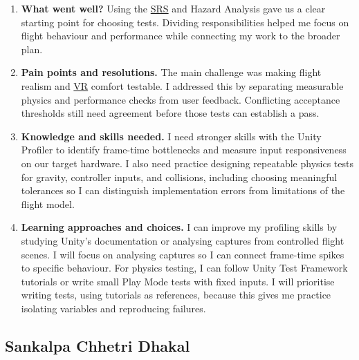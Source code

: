 \documentclass[12pt, titlepage]{article}
\begin{document}
\begin{enumerate}
  \item \textbf{What went well?}
  Using the \hyperlink{abbr:SRS}{SRS} and Hazard Analysis gave us a clear starting point for choosing
  tests. Dividing responsibilities helped me focus on flight behaviour and
  performance while connecting my work to the broader plan.

  \item \textbf{Pain points and resolutions.}
  The main challenge was making flight realism and \hyperlink{abbr:VR}{VR} comfort testable. I
  addressed this by separating measurable physics and performance checks from
  user feedback. Conflicting acceptance thresholds still need agreement before
  those tests can establish a pass.

  \item \textbf{Knowledge and skills needed.}
  I need stronger skills with the Unity Profiler to identify frame-time
  bottlenecks and measure input responsiveness on our target hardware. I also
  need practice designing repeatable physics tests for gravity, controller
  inputs, and collisions, including choosing meaningful tolerances so I can
  distinguish implementation errors from limitations of the flight model.

  \item \textbf{Learning approaches and choices.}
  I can improve my profiling skills by studying Unity's documentation or
  analysing captures from controlled flight scenes. I will focus on analysing
  captures so I can connect frame-time spikes to specific behaviour. For physics
  testing, I can follow Unity Test Framework tutorials or write small Play Mode
  tests with fixed inputs. I will prioritise writing tests, using tutorials as
  references, because this gives me practice isolating variables and reproducing
  failures.
\end{enumerate}

\subsection*{Sankalpa Chhetri Dhakal}
\end{document}
